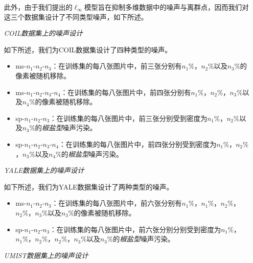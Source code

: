 \begin{table}[!ht]
	\caption{三个用于无监督特征提取的基准数据集的统计信息}
	\label{tab:datesets-ufe}
	\centering
\end{table}

此外，由于我们提出的$\ell_{\infty}$模型旨在抑制多维数据中的噪声与离群点，因而我们对这三个数据集设计了不同类型噪声，如下所述。

\noindent\emph{COIL数据集上的噪声设计}

如下所述，我们为COIL数据集设计了四种类型的噪声。
\begin{itemize}
    \item ms-$n_{1}\text{-}n_{2}\text{-}n_{3}$：在训练集的每八张图片中，前三张分别有$n_{1}\%$，$n_{2}\%$以及$n_{3}\%$的像素被随机移除。
    \item ms-$n_{1}\text{-}n_{2}\text{-}n_{3}\text{-}n_{4}$：在训练集的每八张图片中，前四张分别有$n_{1}\%$，$n_{2}\%$，$n_{3}\%$以及$n_{4}\%$的像素被随机移除。
    \item sp-$n_{1}\text{-}n_{2}\text{-}n_{3}$：在训练集的每八张图片中，前三张分别受到密度为$n_{1}\%$，$n_{2}\%$以及$n_{3}\%$的\emph{椒盐型}噪声污染。
    \item sp-$n_{1}\text{-}n_{2}\text{-}n_{3}\text{-}n_{4}$：在训练集的每八张图片中，前四张分别受到密度为$n_{1}\%$，$n_{2}\%$，$n_{3}\%$以及$n_{4}\%$的\emph{椒盐型}噪声污染。
\end{itemize}
\noindent\emph{YALE数据集上的噪声设计}

如下所述，我们为YALE数据集设计了两种类型的噪声。
\begin{itemize}
    \item ms-$n_{1}\text{-}n_{2}\text{-}n_{3}$：在训练集的每八张图片中，前六张分别有$n_{1}\%$，$n_{1}\%$，$n_{2}\%$，$n_{2}\%$，$n_{3}\%$以及$n_{3}\%$的像素被随机移除。
    \item sp-$n_{1}\text{-}n_{2}\text{-}n_{3}$：在训练集的每八张图片中，前六张分别分别受到密度为$n_{1}\%$，$n_{1}\%$，$n_{2}\%$，$n_{2}\%$，$n_{3}\%$以及$n_{3}\%$的\emph{椒盐型}噪声污染。
\end{itemize}
\noindent\emph{UMIST数据集上的噪声设计}

